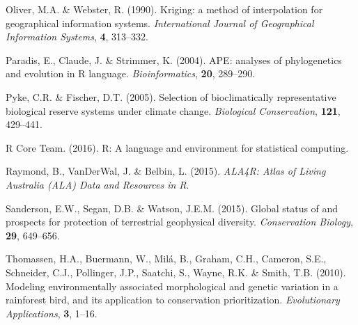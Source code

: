 \documentclass[11pt,]{article}
\begin{document}
Oliver, M.A. \& Webster, R. (1990). Kriging: a method of interpolation
for geographical information systems. \emph{International Journal of
Geographical Information Systems}, \textbf{4}, 313--332.

Paradis, E., Claude, J. \& Strimmer, K. (2004). APE: analyses of
phylogenetics and evolution in R language. \emph{Bioinformatics},
\textbf{20}, 289--290.

Pyke, C.R. \& Fischer, D.T. (2005). Selection of bioclimatically
representative biological reserve systems under climate change.
\emph{Biological Conservation}, \textbf{121}, 429--441.

{R Core Team}. (2016). R: A language and environment for statistical
computing.

Raymond, B., VanDerWal, J. \& Belbin, L. (2015). \emph{ALA4R: Atlas of
Living Australia (ALA) Data and Resources in R}.

Sanderson, E.W., Segan, D.B. \& Watson, J.E.M. (2015). Global status of
and prospects for protection of terrestrial geophysical diversity.
\emph{Conservation Biology}, \textbf{29}, 649--656.

Thomassen, H.A., Buermann, W., Milá, B., Graham, C.H., Cameron, S.E.,
Schneider, C.J., Pollinger, J.P., Saatchi, S., Wayne, R.K. \& Smith,
T.B. (2010). Modeling environmentally associated morphological and
genetic variation in a rainforest bird, and its application to
conservation prioritization. \emph{Evolutionary Applications},
\textbf{3}, 1--16.
\end{document}
